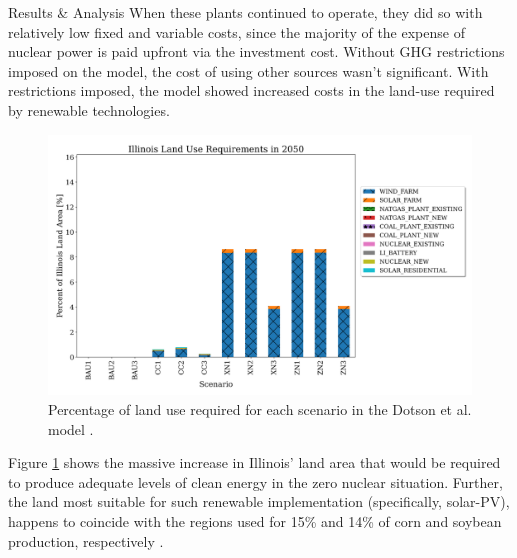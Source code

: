 \documentclass[final]{beamer}
\newlength{\onecolwid}
\newlength{\threecolwid}
\begin{document}
\begin{frame}[t]
\begin{columns}[t,totalwidth=\threecolwid]
\begin{column}{\onecolwid}
\begin{block}{Results \& Analysis}
When these plants continued to operate, they did so with relatively low fixed and variable costs, since the majority of the expense of nuclear power is paid upfront via the investment cost. Without GHG restrictions imposed on the model, the cost of using other sources wasn’t significant. With restrictions imposed, the model showed increased costs in the land-use required by renewable technologies.


\begin{figure}[ht] %
  \centering
  \includegraphics[scale=0.7]{land-use.png}
  \caption{Percentage of land use required for each scenario in the Dotson et al. model \cite{dotson}.}
  \label{fig:landuse}
\end{figure}

Figure \ref{fig:landuse} shows the massive increase in Illinois' land area that would be required to produce adequate levels of clean energy in the zero nuclear situation. Further, the land most suitable for such renewable implementation (specifically, solar-PV), happens to coincide with the regions used for 15\% and 14\% of corn and soybean production, respectively \cite{schleusener}.




\end{block}
\end{column}
\end{columns}
\end{frame}
\end{document}
